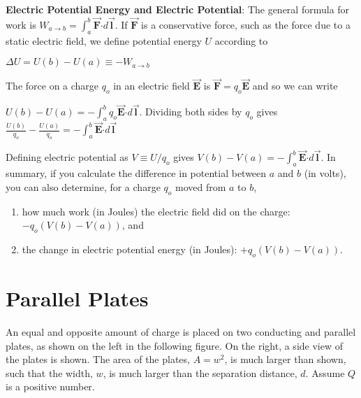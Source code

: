 \documentclass{article}
\newcommand{\ds}[0]{\displaystyle}
\newcommand{\bfvec}[1]{\vec{\mathbf{#1}}}
\newcommand{\bfcdot}[0]{\boldsymbol{\cdot}}
\begin{document}
\textbf{Electric Potential Energy and Electric Potential}: The general formula for work is $W_{a\rightarrow b}=\int_a^b \bfvec{F}\bfcdot d\bfvec{l}$. If $\bfvec{F}$ is a conservative force, such as the force due to a static electric field, we define potential energy $U$ according to

$\Delta U = U(b)-U(a) \equiv -W_{a\rightarrow b}$

The force on a charge $q_o$ in an electric field $\bfvec{E}$ is $\bfvec{F}=q_o\bfvec{E}$ and so we can write

$\ds U(b)-U(a) = -\int_a^b q_o\bfvec{E}\bfcdot d\bfvec{l}$. Dividing both sides by $q_o$ gives $\ds\frac{U(b)}{q_o}-\frac{U(a)}{q_o} = -\int_a^b\bfvec{E}\bfcdot d\bfvec{l}$

Defining electric potential as $V\equiv U/q_o$ gives $V(b)-V(a) = -\int_a^b\bfvec{E}\bfcdot d\bfvec{l}$. In summary, if you calculate the difference in potential between $a$ and $b$ (in volts), you can also determine, for a charge $q_o$ moved from $a$ to $b$,

\begin{enumerate}

  \item how much work (in Joules) the electric field did on the charge: $-q_o(V(b)-V(a))$, and

  \item the change in electric potential energy (in Joules): $+q_o(V(b)-V(a))$.

\end{enumerate}

\section{Parallel Plates}

An equal and opposite amount of charge is placed on two conducting and parallel plates, as shown on the left in the following figure. On the right, a side view of the plates is shown. The area of the plates, $A = w^2$, is much larger than shown, such that the width, $w$, is much larger than the separation distance, $d$. Assume $Q$ is a positive number.


\end{document}
